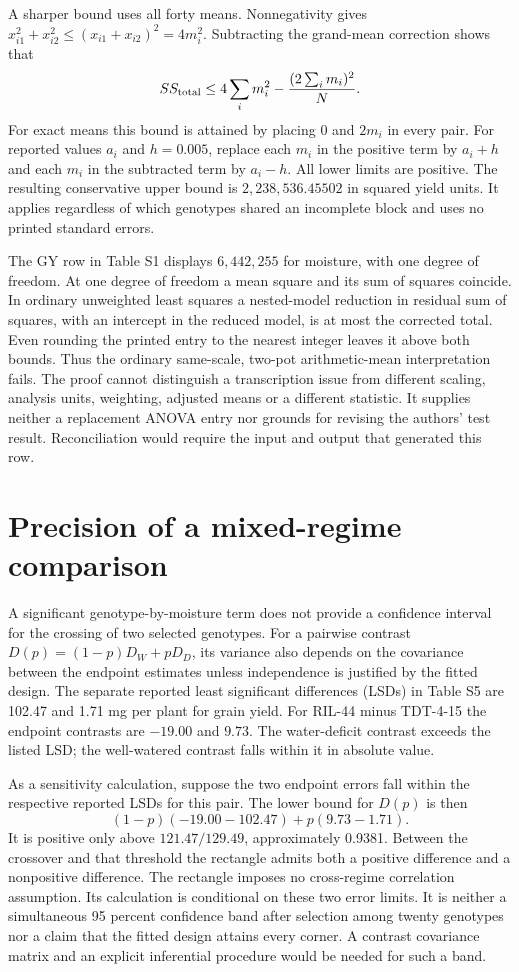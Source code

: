 \documentclass[11pt]{article}
\begin{document}
A sharper bound uses all forty means. Nonnegativity gives
$x_{i1}^2+x_{i2}^2\leq(x_{i1}+x_{i2})^2=4m_i^2$.
Subtracting the grand-mean correction shows that
\[
  SS_{\rm total}\leq 4\sum_i m_i^2-
      \frac{(2\sum_i m_i)^2}{N}.
\]
For exact means this bound is attained by placing $0$ and $2m_i$ in every pair. For reported values $a_i$ and $h=0.005$, replace each $m_i$ in the positive term by $a_i+h$ and each $m_i$ in the subtracted term by $a_i-h$. All lower limits are positive. The resulting conservative upper bound is $2{,}238{,}536.45502$ in squared yield units. It applies regardless of which genotypes shared an incomplete block and uses no printed standard errors.

The GY row in Table S1 displays $6{,}442{,}255$ for moisture, with one degree of freedom. At one degree of freedom a mean square and its sum of squares coincide. In ordinary unweighted least squares a nested-model reduction in residual sum of squares, with an intercept in the reduced model, is at most the corrected total. Even rounding the printed entry to the nearest integer leaves it above both bounds. Thus the ordinary same-scale, two-pot arithmetic-mean interpretation fails. The proof cannot distinguish a transcription issue from different scaling, analysis units, weighting, adjusted means or a different statistic. It supplies neither a replacement ANOVA entry nor grounds for revising the authors' test result. Reconciliation would require the input and output that generated this row.

\section{Precision of a mixed-regime comparison}
A significant genotype-by-moisture term does not provide a confidence interval for the crossing of two selected genotypes. For a pairwise contrast $D(p)=(1-p)D_W+p D_D$, its variance also depends on the covariance between the endpoint estimates unless independence is justified by the fitted design. The separate reported least significant differences (LSDs) in Table S5 are 102.47 and 1.71 mg per plant for grain yield. For RIL-44 minus TDT-4-15 the endpoint contrasts are $-19.00$ and $9.73$. The water-deficit contrast exceeds the listed LSD; the well-watered contrast falls within it in absolute value.

As a sensitivity calculation, suppose the two endpoint errors fall within the respective reported LSDs for this pair. The lower bound for $D(p)$ is then
\[
 (1-p)(-19.00-102.47)+p(9.73-1.71).
\]
It is positive only above $121.47/129.49$, approximately 0.9381. Between the crossover and that threshold the rectangle admits both a positive difference and a nonpositive difference. The rectangle imposes no cross-regime correlation assumption. Its calculation is conditional on these two error limits. It is neither a simultaneous 95 percent confidence band after selection among twenty genotypes nor a claim that the fitted design attains every corner. A contrast covariance matrix and an explicit inferential procedure would be needed for such a band.
\end{document}
